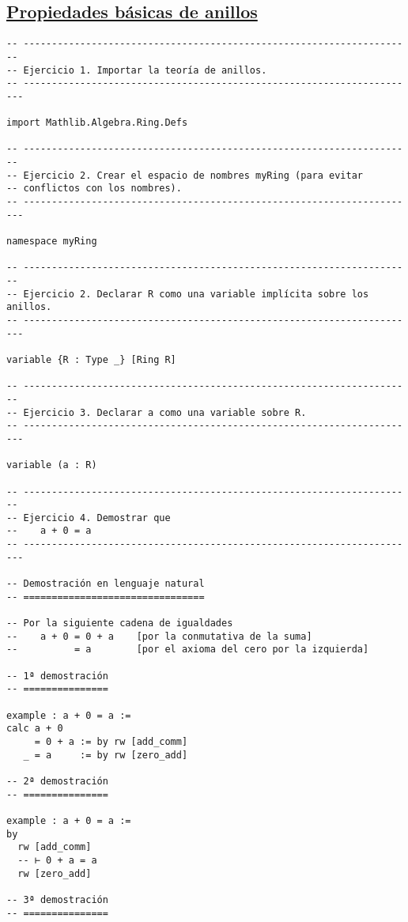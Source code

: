 \subsection{\href{./src/Basicos/Propiedades\_basicas\_de\_anillos.lean}{Propiedades básicas de anillos}}
\label{sec:org9d01647}
\begin{verbatim}
-- ---------------------------------------------------------------------
-- Ejercicio 1. Importar la teoría de anillos.
-- ----------------------------------------------------------------------

import Mathlib.Algebra.Ring.Defs

-- ---------------------------------------------------------------------
-- Ejercicio 2. Crear el espacio de nombres myRing (para evitar
-- conflictos con los nombres).
-- ----------------------------------------------------------------------

namespace myRing

-- ---------------------------------------------------------------------
-- Ejercicio 2. Declarar R como una variable implícita sobre los anillos.
-- ----------------------------------------------------------------------

variable {R : Type _} [Ring R]

-- ---------------------------------------------------------------------
-- Ejercicio 3. Declarar a como una variable sobre R.
-- ----------------------------------------------------------------------

variable (a : R)

-- ---------------------------------------------------------------------
-- Ejercicio 4. Demostrar que
--    a + 0 = a
-- ----------------------------------------------------------------------

-- Demostración en lenguaje natural
-- ================================

-- Por la siguiente cadena de igualdades
--    a + 0 = 0 + a    [por la conmutativa de la suma]
--          = a        [por el axioma del cero por la izquierda]

-- 1ª demostración
-- ===============

example : a + 0 = a :=
calc a + 0
     = 0 + a := by rw [add_comm]
   _ = a     := by rw [zero_add]

-- 2ª demostración
-- ===============

example : a + 0 = a :=
by
  rw [add_comm]
  -- ⊢ 0 + a = a
  rw [zero_add]

-- 3ª demostración
-- ===============


\end{verbatim}
